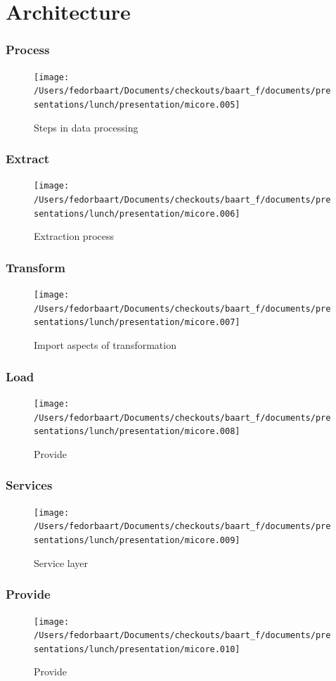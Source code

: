 \documentclass[]{beamer}
\begin{document}
\section{Architecture}
\frame
{
  \frametitle{Process}

  \begin{figure}[htbp]
   \centering
   \texttt{[image: /Users/fedorbaart/Documents/checkouts/baart\_f/documents/presentations/lunch/presentation/micore.005]} %
   \caption{Steps in data processing}
   \label{fig:processes}
\end{figure}
}

\frame
{
  \frametitle{Extract}

  \begin{figure}[htbp]
   \centering
   \texttt{[image: /Users/fedorbaart/Documents/checkouts/baart\_f/documents/presentations/lunch/presentation/micore.006]} %
   \caption{Extraction process}
   \label{fig:processes}
\end{figure}
}


\frame
{
  \frametitle{Transform}

  \begin{figure}[htbp]
   \centering
   \texttt{[image: /Users/fedorbaart/Documents/checkouts/baart\_f/documents/presentations/lunch/presentation/micore.007]} %
   \caption{Import aspects of transformation}
   \label{fig:processes}
\end{figure}
}


\frame
{
  \frametitle{Load}

  \begin{figure}[htbp]
   \centering
   \texttt{[image: /Users/fedorbaart/Documents/checkouts/baart\_f/documents/presentations/lunch/presentation/micore.008]} %
   \caption{Provide}
   \label{fig:processes}
\end{figure}
}

\frame
{
  \frametitle{Services}

  \begin{figure}[htbp]
   \centering
   \texttt{[image: /Users/fedorbaart/Documents/checkouts/baart\_f/documents/presentations/lunch/presentation/micore.009]} %
   \caption{Service layer}
   \label{fig:processes}
\end{figure}
}

\frame
{
  \frametitle{Provide}

  \begin{figure}[htbp]
   \centering
   \texttt{[image: /Users/fedorbaart/Documents/checkouts/baart\_f/documents/presentations/lunch/presentation/micore.010]} %
   \caption{Provide}
   \label{fig:processes}
\end{figure}
}
\end{document}
